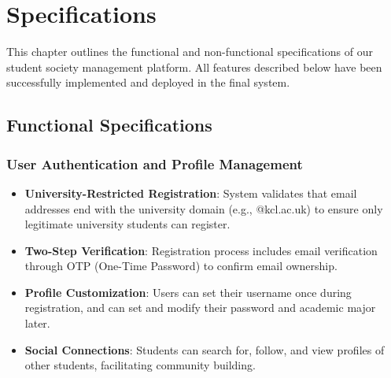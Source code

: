 \chapter{Specifications}

This chapter outlines the functional and non-functional specifications of our student society management platform. All features described below have been successfully implemented and deployed in the final system.

\section{Functional Specifications}

\subsection{User Authentication and Profile Management}
\begin{itemize}
    \item \textbf{University-Restricted Registration}: System validates that email addresses end with the university domain (e.g., @kcl.ac.uk) to ensure only legitimate university students can register.
    \item \textbf{Two-Step Verification}: Registration process includes email verification through OTP (One-Time Password) to confirm email ownership.
    \item \textbf{Profile Customization}: Users can set their username once during registration, and can set and modify their password and academic major later.
    \item \textbf{Social Connections}: Students can search for, follow, and view profiles of other students, facilitating community building.
\end{itemize}

